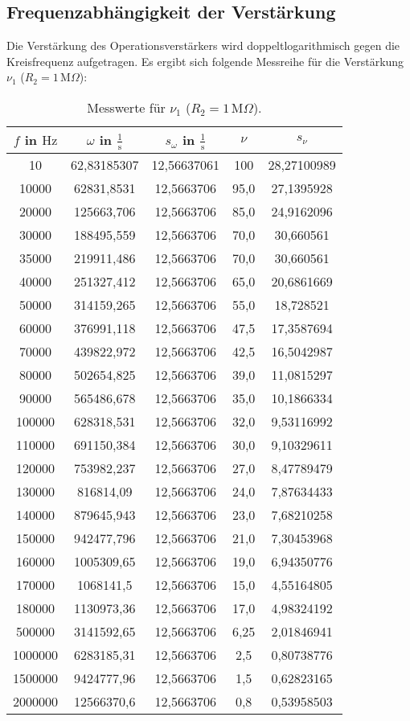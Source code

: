 \subsection{Frequenzabhängigkeit der Verstärkung}
Die Verstärkung des Operationsverstärkers wird doppeltlogarithmisch gegen die Kreisfrequenz aufgetragen.
Es ergibt sich folgende Messreihe für die Verstärkung $\nu_1$ ($R_2=1\,\text{M}\Omega$):
\begin{table}[htbp]
    \centering
      \begin{tabular}{c||c|c|c|c}
      $f$ in $\text{Hz}$ & $\omega$ in $\frac{1}{\text{s}}$ & $s_\omega$ in $\frac{1}{\text{s}}$& $\nu$ & $s_\nu$\\
      \hline
      10 & 62,83185307 & 12,56637061 & 100 & 28,27100989\\
      10000 & 62831,8531 & 12,5663706 & 95,0    & 27,1395928 \\
      20000 & 125663,706 & 12,5663706 & 85,0  & 24,9162096 \\
      30000 & 188495,559 & 12,5663706 & 70,0    & 30,660561 \\
      35000 & 219911,486 & 12,5663706 & 70,0    & 30,660561 \\
      40000 & 251327,412 & 12,5663706 & 65,0    & 20,6861669 \\
      50000 & 314159,265 & 12,5663706 & 55,0    & 18,728521 \\
      60000 & 376991,118 & 12,5663706 & 47,5  & 17,3587694 \\
      70000 & 439822,972 & 12,5663706 & 42,5  & 16,5042987 \\
      80000 & 502654,825 & 12,5663706 & 39,0    & 11,0815297 \\
      90000 & 565486,678 & 12,5663706 & 35,0    & 10,1866334 \\
      100000 & 628318,531 & 12,5663706 & 32,0    & 9,53116992 \\
      110000 & 691150,384 & 12,5663706 & 30,0    & 9,10329611 \\
      120000 & 753982,237 & 12,5663706 & 27,0    & 8,47789479 \\
      130000 & 816814,09 & 12,5663706 & 24,0    & 7,87634433 \\
      140000 & 879645,943 & 12,5663706 & 23,0    & 7,68210258 \\
      150000 & 942477,796 & 12,5663706 & 21,0    & 7,30453968 \\
      160000 & 1005309,65 & 12,5663706 & 19,0    & 6,94350776 \\
      170000 & 1068141,5 & 12,5663706 & 15,0    & 4,55164805 \\
      180000 & 1130973,36 & 12,5663706 & 17,0    & 4,98324192 \\
      500000 & 3141592,65 & 12,5663706 & 6,25  & 2,01846941 \\
      1000000 & 6283185,31 & 12,5663706 & 2,5   & 0,80738776 \\
      1500000 & 9424777,96 & 12,5663706 & 1,5   & 0,62823165 \\
      2000000 & 12566370,6 & 12,5663706 & 0,8   & 0,53958503 \\
      \end{tabular}%
      \caption{Messwerte für $\nu_1$ ($R_2=1\,\text{M}\Omega$).}
\end{table}\newpage
